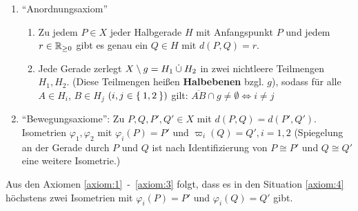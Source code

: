 \begin{definition}
    \begin{enumerate}[label=§\arabic*),ref=§\arabic*,start=3]
        \item \enquote{Anordnungsaxiom}\label{axiom:3}
            \begin{enumerate}[label=(\roman*),ref=§\theenumi{} (\roman*)]
                \item  Zu jedem $P \in X$ jeder Halbgerade $H$ mit \label{axiom:3.1}
                      Anfangspunkt $P$ und jedem $r \in \mathbb{R}_{\geq 0}$
                      gibt es genau ein $Q \in H$ mit $d(P,Q) = r$.
                \item Jede Gerade zerlegt $X \setminus g = H_1 \mathbin{\dot{\cup}} H_2$\label{axiom:4}
                      in zwei nichtleere Teilmengen $H_1, H_2$.
                      (Diese Teilmengen heißen \textbf{Halbebenen} bzgl. $g$),
                      sodass für alle $A \in H_i$, $B \in H_j$
                      $(i,j \in \Set{1,2})$ gilt: $\overline{AB} \cap g \neq \emptyset \Leftrightarrow i \neq j$
            \end{enumerate}
        \item \enquote{Bewegungsaxiome}: Zu $P, Q, P', Q' \in X$
            mit $d(P,Q) = d(P', Q')$. Isometrien $\varphi_1, \varphi_2$
            mit $\varphi_i (P) = P'$ und $\varpi_i(Q) = Q', i=1,2$
            (Spiegelung an der Gerade durch $P$ und $Q$ ist nach 
             Identifizierung von $P \cong P'$ und $Q \cong Q'$ eine
             weitere Isometrie.)
    \end{enumerate}
\end{definition}

\begin{proposition}%
    Aus den Axiomen \ref{axiom:1}~-~\ref{axiom:3} folgt, dass es in 
    den Situation \ref{axiom:4} höchstens zwei Isometrien mit
    $\varphi_i(P) = P'$ und $\varphi_i(Q) = Q'$ gibt.
\end{proposition}

